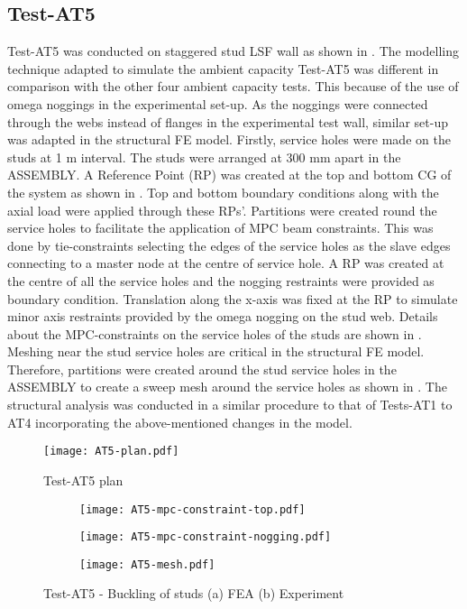 \subsection*{Test-AT5}

Test-AT5 was conducted on staggered stud LSF wall as shown in . The modelling technique adapted to simulate the ambient capacity Test-AT5 was different in comparison with the other four ambient capacity tests. This because of the use of omega noggings in the experimental set-up. As the noggings were connected through the webs instead of flanges in the experimental test wall, similar set-up was adapted in the structural FE model. Firstly, service holes were made on the studs at 1 m interval. The studs were arranged at 300 mm apart in the ASSEMBLY. A Reference Point (RP) was created at the top and bottom CG of the system as shown in . Top and bottom boundary conditions along with the axial load were applied through these RPs'. Partitions were created round the service holes to facilitate the application of MPC beam constraints. This was done by tie-constraints selecting the edges of the service holes as the slave edges connecting to a master node at the centre of service hole. A RP was created at the centre of all the service holes and the nogging restraints were provided as boundary condition. Translation along the x-axis was fixed at the RP to simulate minor axis restraints provided by the omega nogging on the stud web. Details about the MPC-constraints on the service holes of the studs are shown in . Meshing near the stud service holes are critical in the structural FE model. Therefore, partitions were created around the stud service holes in the ASSEMBLY to create a sweep mesh around the service holes as shown in . The structural analysis was conducted in a similar procedure to that of Tests-AT1 to AT4 incorporating the above-mentioned changes in the model.
\begin{figure}[!htbp]
	\centering
			\texttt{[image: AT5-plan.pdf]}\\
		\caption{Test-AT5 plan}
		\label{fig:AT5-plan-fea}
\end{figure}    
\begin{figure}[!htbp]
	\centering
	\begin{subfigure}[b]{0.3\textwidth}
		\centering
		\texttt{[image: AT5-mpc-constraint-top.pdf]}
		\caption{}
		\label{subfig:AT5-mpc-constraint-top}
	\end{subfigure}
	\begin{subfigure}[b]{0.5\textwidth}
		\centering
		\texttt{[image: AT5-mpc-constraint-nogging.pdf]}
		\caption{}
		\label{subfig:AT5-mpc-constraint-nogging}
	\end{subfigure}
	\begin{subfigure}[b]{0.5\textwidth}
		\centering
		\texttt{[image: AT5-mesh.pdf]}
		\caption{}
		\label{subfig:AT5-mesh}
	\end{subfigure}
	   \caption{Test-AT5 - Buckling of studs (a) FEA (b) Experiment}
	   \label{fig:AT5-modelling-fea}
\end{figure} 

